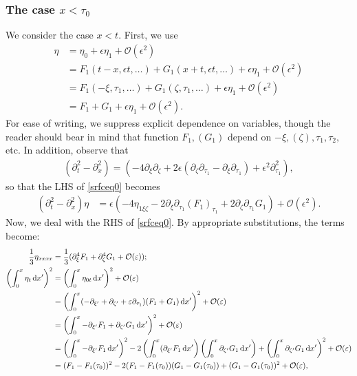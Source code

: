 \documentclass[10pt,reqno,oneside,a4paper, landscape]{article}
\begin{document}
\subsubsection*{The case $x<\tau_0$}
We consider the case $x<t.$ First, we use
\begin{align*}
\eta &= \eta_0 + \epsilon \eta_1 + \mathcal{O}(\epsilon^2)  \\
&= F_1(t-x, \epsilon t, \ldots) + G_1(x+t, \epsilon t, \ldots) + \epsilon \eta_1 + \mathcal{O}(\epsilon^2) \\
&= F_1(-\xi, \tau_1, \ldots) + G_1(\zeta, \tau_1, \ldots) + \epsilon \eta_1 + \mathcal{O}(\epsilon^2) \\
&= F_1+G_1 + \epsilon \eta_1 +  \mathcal{O}(\epsilon^2).
\end{align*}
For ease of writing, we suppress explicit dependence on variables, though the reader should bear in mind that function $F_1, (G_1)$ depend on $-\xi, (\zeta), \tau_1, \tau_2,$ etc. In addition, observe that
\begin{align*}
(\partial_t^2 - \partial_x^2) = \left( - 4\partial_\xi \partial_\zeta + 2\epsilon(\partial_\zeta \partial_{\tau_1} - \partial_\xi\partial_{\tau_1}) + \epsilon^2 \partial_{\tau_1}^2 \right),
\end{align*}
so that the LHS of \eqref{srfceq0} becomes
\begin{align}
(\partial_t^2 - \partial_x^2) \eta &= \epsilon \left(- 4\eta_{1\xi \zeta} - 2\partial_{\xi}\partial_{\tau_1}(F_1)_{\tau_1} + 2\partial_\zeta \partial_{\tau_1}G_1 \right) + \mathcal{O}(\epsilon^2). \label{LHS1-1}
\end{align}
Now, we deal with the RHS of \eqref{srfceq0}. By appropriate substitutions, the terms become:
\begin{align*}
\frac{1}{3}\eta_{xxxx} &= \frac{1}{3}(\partial_\xi^4 F_1 + \partial_\zeta^4G_1+ \mathcal{O}(\varepsilon)); \\
\left( \int^{x}_{0} \eta_t \,\mathrm{d} x' \right)^2 &= \left( \int^{x}_{0} \eta_{0t} \,\mathrm{d} x' \right)^2 + \mathcal{O}(\varepsilon) \\
&= \left( \int^{x}_{0}(-\partial_{\xi'} + \partial_{\zeta'} + \varepsilon \partial_{\tau_1}) (F_1+G_1) \,\mathrm{d} x' \right)^2 + \mathcal{O}(\varepsilon)\\ 
&= \left( \int^{x}_{0} - \partial_{\xi'}F_1 + \partial_{\zeta'} G_1 \,\mathrm{d} x' \right)^2 + \mathcal{O}(\varepsilon)\\
&= \left( \int^{x}_{0} -\partial_{\xi'}F_1 \,\mathrm{d} x'\right)^2 - 2\left( \int^{x}_{0}( \partial_{\xi'} F_1 \,\mathrm{d} x'\right)\left( \int^{x}_{0}\partial_{\zeta'}G_1 \,\mathrm{d} x'\right) + \left( \int^{x}_{0} \partial_{\zeta'} G_1 \,\mathrm{d} x'\right)^2 + \mathcal{O}(\varepsilon) \\
&= (F_1 - F_1(\tau_0))^2 - 2(F_1 - F_1(\tau_0))(G_1 - G_1(\tau_0)) + (G_1 - G_1(\tau_0))^2 + \mathcal{O}(\varepsilon),
\end{align*}
\end{document}
